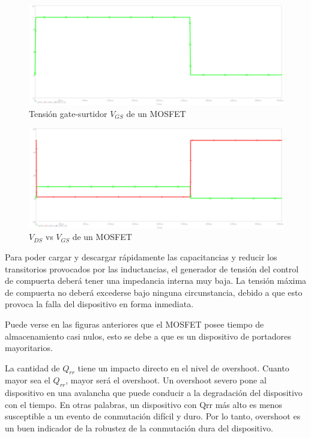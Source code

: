 \documentclass[conference]{IEEEtran}
\begin{document}
\begin{figure}[H]
	\centering
	\includegraphics[width=\columnwidth]{imagenes/vgs_mosfet}
	\caption{Tensión gate-surtidor $V_{GS}$ de un MOSFET}
	\label{fig:vgs_mosfet}
\end{figure}

\begin{figure}[H]
	\centering
	\includegraphics[width=\columnwidth]{imagenes/vds_vgs_mosfet}
\caption{$V_{DS}$ vs $V_{GS}$ de un MOSFET}
	\label{fig:vds_vgs_mosfet}
\end{figure}

Para poder cargar y descargar rápidamente las capacitancias y reducir los transitorios provocados por las inductancias, el generador de tensión del control de compuerta deberá tener una impedancia interna muy baja. La tensión máxima de compuerta no deberá excederse bajo ninguna circunstancia, debido a que esto provoca la falla del dispositivo en forma inmediata.

Puede verse en las figuras anteriores que el MOSFET posee tiempo de almacenamiento casi nulos, esto se debe a que es un dispositivo de portadores mayoritarios. 

La cantidad de $Q_{rr}$ tiene un impacto directo en el nivel de overshoot. Cuanto mayor sea el $Q_{rr}$, mayor será el overshoot. Un overshoot severo pone al dispositivo en una avalancha que puede conducir a la degradación del dispositivo con el tiempo. En otras palabras, un dispositivo con Qrr más alto es menos susceptible a un evento de conmutación difícil y duro. Por lo tanto, overshoot es un buen indicador de la robustez de la conmutación dura del dispositivo.
\end{document}
